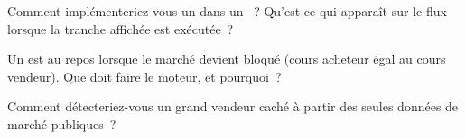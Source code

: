 \begin{interviewq}\label{iq:mx:order-types-and-their-uses:4}
Comment implémenteriez-vous un  dans un ~? Qu'est-ce qui apparaît sur le flux lorsque la tranche affichée est exécutée~?
\end{interviewq}

\begin{interviewq}\label{iq:mx:order-types-and-their-uses:5}
Un  est au repos lorsque le marché devient bloqué (cours acheteur égal au cours vendeur). Que doit faire le moteur, et pourquoi~?
\end{interviewq}

\begin{interviewq}\label{iq:mx:order-types-and-their-uses:6}
Comment détecteriez-vous un grand vendeur caché à partir des seules données de marché publiques~?
\end{interviewq}
